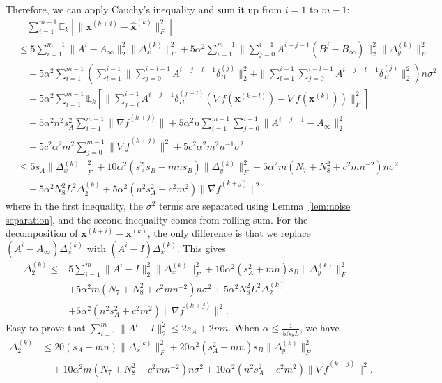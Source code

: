 \documentclass[10pt]{article}
\newcommand{\vx}{{\mathbf{x}}}
\newcommand{\EE}{\mathbb{E}}
\newcommand{\norm}[1]{\| #1 \|}
\begin{document}
Therefore, we can apply Cauchy's inequality and sum it up from $i=1$ to $m-1$:
\begin{align*}
    &\quad\sum_{i=1}^{m-1}\EE_k[\norm{\vx^{(k+i)}-\hat{\vx}^{(k)}}_F^2]\\
    &\le 5\sum_{i=1}^{m-1}\norm{A^i-A_\infty}_2^2\norm{\Delta_x^{(k)}}_F^2+5\alpha^2 \sum_{i=1}^{m-1}\norm{\sum_{j=0}^{i-1}A^{i-j-1}(B^j-B_\infty)}_2^2\norm{\Delta_y^{(k)}}_F^2\\
    &\quad+5\alpha^2 \sum_{i=1}^{m-1}(\sum_{l=1}^{i-1}\norm{\sum_{j=0}^{i-l-1}A^{i-j-l-1}\delta_B^{(j)}}_2^2+\norm{\sum_{l=1}^{i-1}\sum_{j=0}^{i-l-1}A^{i-j-l-1}\delta_B^{(j)}}_2^2 )n\sigma^2\\
    &\quad+5\alpha^2\sum_{i=1}^{m-1}\EE_k[\norm{\sum_{j=l}^{i-1}A^{i-j-1}\delta_B^{(j-l)}(\nabla f(\vx^{(k+l)})-\nabla f(\vx^{(k)}))}_F^2]\\
    &\quad+5\alpha^2n^2s_A^2\sum_{i=1}^{m-1}\norm{\overline{\nabla f}^{(k+j)}}+5\alpha^2 n\sum_{i=1}^{m-1}\sum_{j=0}^{i-1}\norm{A^{i-j-1}-A_\infty}_2^2 \\
    &\quad+5c^2\alpha^2m^2 \sum_{j=0}^{m-1}\norm{\overline{\nabla f}^{(k+j)}}^2+5c^2\alpha^2m^2n^{-1}\sigma^2\\
    &\le 5s_A\norm{\Delta_x^{(k)}}_F^2 + 10\alpha^2(s_A^2s_B+mns_B)\norm{\Delta_y^{(k)}}_F^2+5\alpha^2 m (N_7+N_8^2+c^2mn^{-2})n\sigma^2\\
    &\quad+ 5\alpha^2 N_8^2 L^2 \Delta_2^{(k)} + 5\alpha^2(n^2s_A^2+c^2m^2)\norm{\overline{\nabla f}^{(k+j)}}^2.
\end{align*}
where in the first inequality, the $\sigma^2$ terms are separated using Lemma~\ref{lem:noise separation}, and the second inequality comes from rolling sum.
For the decomposition of $\vx^{(k+i)}-\vx^{(k)}$, the only difference is that we replace $(A^i-A_\infty)\Delta_x^{(k)}$ with $(A^i-I)\Delta_x^{(k)}$. This gives
\begin{align*}
    \quad\Delta_2^{(k)}\le &5\sum_{i=1}^{m}\norm{A^i-I}_2^2\norm{\Delta_x^{(k)}}_F^2+ 10\alpha^2(s_A^2+mn)s_B\norm{\Delta_y^{(k)}}_F^2\\
    &+5\alpha^2 m (N_7+N_8^2+c^2mn^{-2})n\sigma^2+ 5\alpha^2 N_8^2 L^2 \Delta_2^{(k)} \\
    &+ 5\alpha^2(n^2s_A^2+c^2m^2)\norm{\overline{\nabla f}^{(k+j)}}^2.
\end{align*}
Easy to prove that $\sum_{i=1}^{m}\norm{A^i-I}_2^2\le 2s_A+2mn$. When $\alpha \le \frac{1}{5N_8L}$, we have
\begin{align}\label{ieq(app):delta 2}
    \Delta_2^{(k)}&\le 20(s_A+mn)\norm{\Delta_x^{(k)}}_F^2+ 20\alpha^2(s_A^2+mn)s_B\norm{\Delta_y^{(k)}}_F^2\\
    &\quad+10\alpha^2 m (N_7+N_8^2+c^2mn^{-2})n\sigma^2+10\alpha^2(n^2s_A^2+c^2m^2)\norm{\overline{\nabla f}^{(k+j)}}^2.\nonumber
\end{align}
\end{document}
